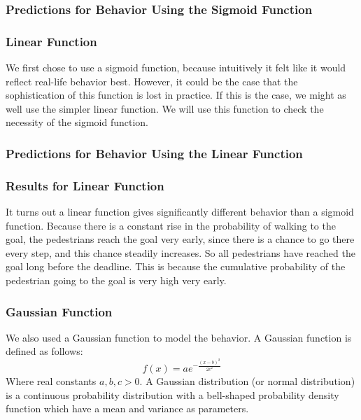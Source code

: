\documentclass[11pt]{book}
\begin{document}

\subsubsection{Predictions for Behavior Using the Sigmoid Function}


\subsubsection{Linear Function}
We first chose to use a sigmoid function, because intuitively it felt like it would reflect real-life behavior best. However, it could be the case that the sophistication of this function is lost in practice. If this is the case, we might as well use the simpler linear function. We will use this function to check the necessity of the sigmoid function.

\subsubsection{Predictions for Behavior Using the Linear Function}

\subsubsection{Results for Linear Function}
It turns out a linear function gives significantly different behavior than a sigmoid function. Because there is a constant rise in the probability of walking to the goal, the pedestrians reach the goal very early, since there is a chance to go there every step, and this chance steadily increases. So all pedestrians have reached the goal long before the deadline. This is because the cumulative probability of the pedestrian going to the goal is very high very early.

\subsubsection{Gaussian Function}
We also used a Gaussian function to model the behavior. A Gaussian function is defined as follows:
\begin{equation}f(x) = ae^{- \frac{(x-b)^2}{2c^2}}\end{equation}
Where real constants $a, b, c > 0 $. A Gaussian distribution (or normal distribution) is a continuous probability distribution with a bell-shaped probability density function which have a mean and variance as parameters.
\end{document}
